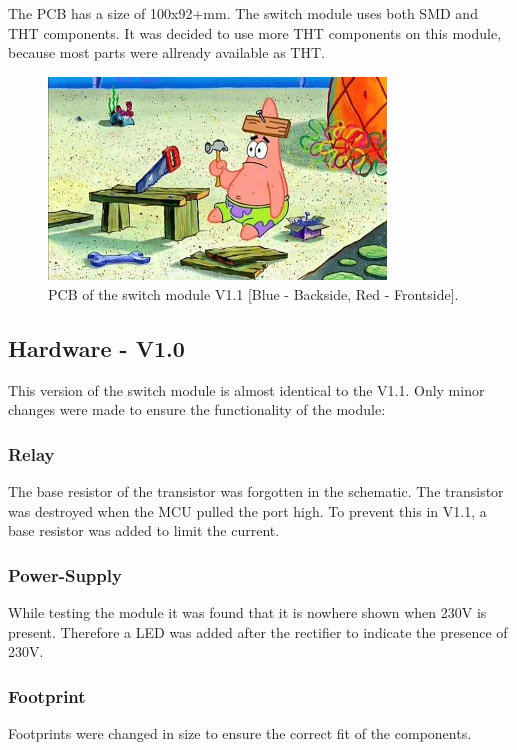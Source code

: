        The PCB has a size of 100x92+mm. The switch module uses both SMD and THT components. It was decided to use more THT 
        components on this module, because most parts were allready available as THT.

        \begin{figure}[H]
            \centering
            \includegraphics[width=0.8\textwidth]{assets/HW/TBD.png}
            \caption{PCB of the switch module V1.1 [Blue - Backside, Red - Frontside].}
        \end{figure}


\subsection{Hardware - V1.0}

    This version of the switch module is almost identical to the V1.1. Only minor changes were made
    to ensure the functionality of the module:

    \subsubsection{Relay}
    The base resistor of the transistor was forgotten in the schematic. The transistor was destroyed
    when the MCU pulled the port high. To prevent this in V1.1, a base resistor was added to limit 
    the current.

    \subsubsection{Power-Supply}
    While testing the module it was found that it is nowhere shown when 230V is present. Therefore
    a LED was added after the rectifier to indicate the presence of 230V.

    \subsubsection{Footprint}
    Footprints were changed in size to ensure the correct fit of the components.

